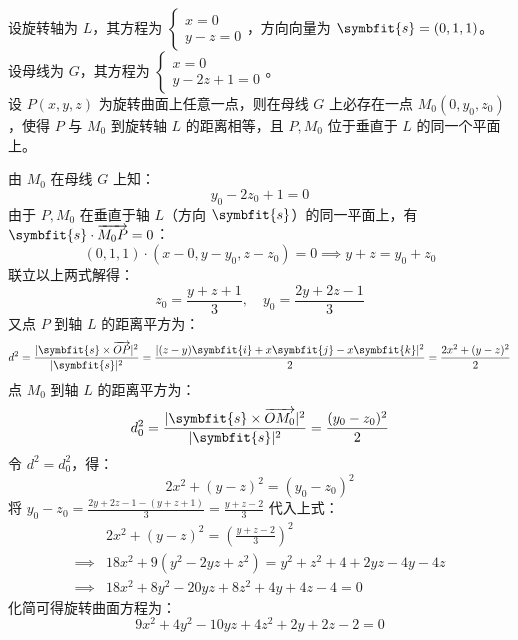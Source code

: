 \begin{solution}
    设旋转轴为 $L$，其方程为 $\begin{cases} x = 0 \\ y - z = 0 \end{cases}$，方向向量为 $\symbfit{s} = (0, 1, 1)$。\\
    设母线为 $G$，其方程为 $\begin{cases} x = 0 \\ y - 2z + 1 = 0 \end{cases}$。\\
    设 $P(x, y, z)$ 为旋转曲面上任意一点，则在母线 $G$ 上必存在一点 $M_0(0, y_0, z_0)$，使得 $P$ 与 $M_0$ 到旋转轴 $L$ 的距离相等，且 $P, M_0$ 位于垂直于 $L$ 的同一个平面上。

    由 $M_0$ 在母线 $G$ 上知：
    \begin{equation}
        y_0 - 2z_0 + 1 = 0
    \end{equation}
    由于 $P, M_0$ 在垂直于轴 $L$（方向 $\symbfit{s}$）的同一平面上，有 $\symbfit{s} \cdot \overrightarrow{M_0 P} = 0$：
    \begin{equation}
        (0, 1, 1) \cdot (x - 0, y - y_0, z - z_0) = 0 \implies y + z = y_0 + z_0
    \end{equation}
    联立以上两式解得：
    \begin{equation}
        z_0 = \frac{y + z + 1}{3}, \quad y_0 = \frac{2y + 2z - 1}{3}
    \end{equation}
    又点 $P$ 到轴 $L$ 的距离平方为：
    \begin{equation}
        d^2 = \frac{|\symbfit{s} \times \overrightarrow{OP}|^2}{|\symbfit{s}|^2} = \frac{|(z - y) \symbfit{i} + x \symbfit{j} - x \symbfit{k}|^2}{2} = \frac{2x^2 + (y - z)^2}{2}
    \end{equation}
    点 $M_0$ 到轴 $L$ 的距离平方为：
    \begin{equation}
        d_0^2 = \frac{|\symbfit{s} \times \overrightarrow{OM_0}|^2}{|\symbfit{s}|^2} = \frac{(y_0 - z_0)^2}{2}
    \end{equation}
    令 $d^2 = d_0^2$，得：
    \begin{equation}
        2x^2 + (y - z)^2 = (y_0 - z_0)^2
    \end{equation}
    将 $y_0 - z_0 = \frac{2y + 2z - 1 - (y + z + 1)}{3} = \frac{y + z - 2}{3}$ 代入上式：
    \begin{equation}
        \begin{aligned}
                     & 2x^2 + (y - z)^2 = \left( \frac{y + z - 2}{3} \right)^2    \\
            \implies & 18x^2 + 9(y^2 - 2yz + z^2) = y^2 + z^2 + 4 + 2yz - 4y - 4z \\
            \implies & 18x^2 + 8y^2 - 20yz + 8z^2 + 4y + 4z - 4 = 0
        \end{aligned}
    \end{equation}
    化简可得旋转曲面方程为：
    \begin{equation}
        \boxed{9x^2 + 4y^2 - 10yz + 4z^2 + 2y + 2z - 2 = 0}
    \end{equation}
\end{solution}


